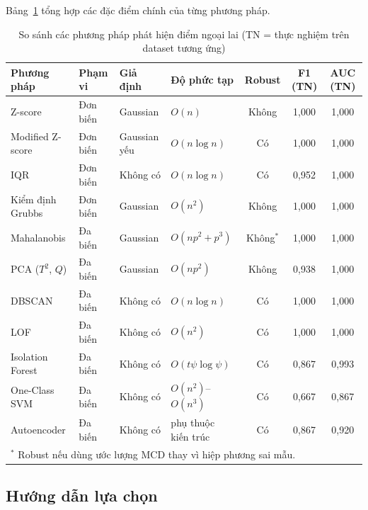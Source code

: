 \documentclass[11pt,a4paper]{article}
\begin{document}
Bảng~\ref{tab:comparison} tổng hợp các đặc điểm chính của từng phương pháp.

\begin{table}[ht]
\centering
\caption{So sánh các phương pháp phát hiện điểm ngoại lai (TN = thực nghiệm trên dataset tương ứng)}
\label{tab:comparison}
\footnotesize
\begin{tabular}{llllccc}
\toprule
\textbf{Phương pháp} & \textbf{Phạm vi} & \textbf{Giả định} & \textbf{Độ phức tạp} & \textbf{Robust} & \textbf{F1 (TN)} & \textbf{AUC (TN)} \\
\midrule
Z-score             & Đơn biến & Gaussian      & $O(n)$                & Không & 1,000 & 1,000 \\
Modified Z-score    & Đơn biến & Gaussian yếu  & $O(n \log n)$         & Có    & 1,000 & 1,000 \\
IQR                 & Đơn biến & Không có      & $O(n \log n)$         & Có    & 0,952 & 1,000 \\
Kiểm định Grubbs   & Đơn biến & Gaussian      & $O(n^2)$              & Không & 1,000 & 1,000 \\
\midrule
Mahalanobis         & Đa biến  & Gaussian      & $O(np^2 + p^3)$       & Không$^*$ & 1,000 & 1,000 \\
PCA ($T^2$, $Q$)   & Đa biến  & Gaussian      & $O(np^2)$             & Không & 0,938 & 1,000 \\
\midrule
DBSCAN              & Đa biến  & Không có      & $O(n \log n)$         & Có    & 1,000 & 1,000 \\
LOF                 & Đa biến  & Không có      & $O(n^2)$              & Có    & 1,000 & 1,000 \\
\midrule
Isolation Forest    & Đa biến  & Không có      & $O(t\psi \log\psi)$   & Có    & 0,867 & 0,993 \\
One-Class SVM       & Đa biến  & Không có      & $O(n^2)$--$O(n^3)$    & Có    & 0,667 & 0,867 \\
Autoencoder         & Đa biến  & Không có      & phụ thuộc kiến trúc   & Có    & 0,867 & 0,920 \\
\bottomrule
\multicolumn{7}{l}{\footnotesize $^*$ Robust nếu dùng ước lượng MCD \parencite{rousseeuw1999} thay vì hiệp phương sai mẫu.}
\end{tabular}
\end{table}

\subsection{Hướng dẫn lựa chọn}
\end{document}
